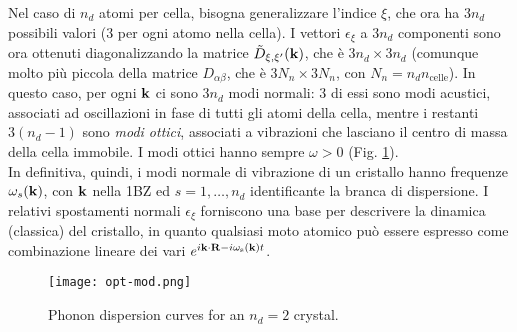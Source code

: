 Nel caso di $ n_d $ atomi per cella, bisogna generalizzare l'indice $ \xi $, che ora ha $ 3n_d $ possibili valori (3 per ogni atomo nella cella). I vettori $ \epsilon_\xi $ a $ 3n_d $ componenti sono ora ottenuti diagonalizzando la matrice $ \tilde{D}_{\xi , \xi'}(\mathbf{k}) $, che è $ 3n_d \times 3n_d $ (comunque molto più piccola della matrice $ D_{\alpha \beta} $, che è $ 3N_n \times 3N_n $, con $ N_n = n_d n_\text{celle} $). In questo caso, per ogni $ \mathbf{k} $ ci sono $ 3n_d $ modi normali: $ 3 $ di essi sono modi acustici, associati ad oscillazioni in fase di tutti gli atomi della cella, mentre i restanti $ 3(n_d - 1) $ sono \textit{modi ottici}\footnotemark, associati a vibrazioni che lasciano il centro di massa della cella immobile. I modi ottici hanno sempre $ \omega > 0 $ (Fig. \ref{op-md}). \\
In definitiva, quindi, i modi normale di vibrazione di un cristallo hanno frequenze $ \omega_s(\mathbf{k}) $, con $ \mathbf{k} $ nella 1BZ ed $ s = 1,\dots,n_d $ identificante la branca di dispersione. I relativi spostamenti normali $ \epsilon_\xi $ forniscono una base per descrivere la dinamica (classica) del cristallo, in quanto qualsiasi moto atomico può essere espresso come combinazione lineare dei vari $ e^{i \mathbf{k} \cdot \mathbf{R} - i \omega_\text{s}(\mathbf{k}) t} $.
%

\begin{figure}
	\centering
	\texttt{[image: opt-mod.png]}
	\caption{Phonon dispersion curves for an $ n_d = 2 $ crystal.}
	\label{op-md}
\end{figure}

